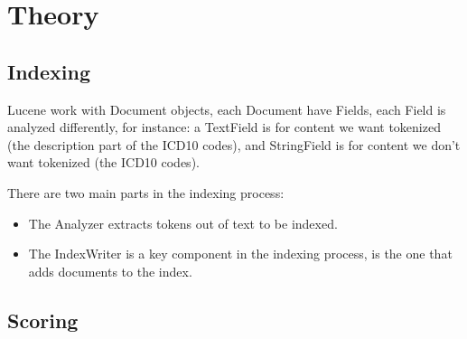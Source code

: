 \chapter{Theory}
\label{cha:theory}


\section{Indexing}
\label{sec:indexing}

Lucene work with Document objects, each Document have Fields, each Field is
analyzed differently, for instance: a TextField is for content we want tokenized
(the description part of the ICD10 codes), and StringField is for content we
don't want tokenized (the ICD10 codes).

There are two main parts in the indexing process:

\begin{itemize}
\item The Analyzer extracts tokens out of text to be indexed.

\item The IndexWriter is a key component in the indexing process, is the one
      that adds documents to the index.
\end{itemize}


\section{Scoring}
\label{sec:scoring}

